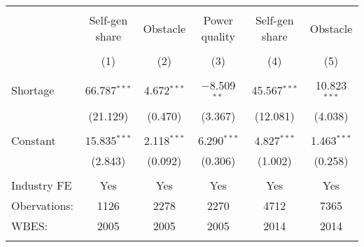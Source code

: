 
\begingroup 
\small 
\begin{tabular}{@{\extracolsep{5pt}}lccccc} 
\\[-1.8ex]\hline 
\hline \\[-1.8ex] 
 & Self-gen share & Obstacle & Power quality & Self-gen share & Obstacle \\ 
\\[-1.8ex] & (1) & (2) & (3) & (4) & (5)\\ 
\hline \\[-1.8ex] 
 Shortage & 66.787$^{***}$ & 4.672$^{***}$ & $-$8.509$^{**}$ & 45.567$^{***}$ & 10.823$^{***}$ \\ 
  & (21.129) & (0.470) & (3.367) & (12.081) & (4.038) \\ 
  & & & & & \\ 
 Constant & 15.835$^{***}$ & 2.118$^{***}$ & 6.290$^{***}$ & 4.827$^{***}$ & 1.463$^{***}$ \\ 
  & (2.843) & (0.092) & (0.306) & (1.002) & (0.258) \\ 
  & & & & & \\ 
Industry FE & Yes & Yes & Yes & Yes & Yes \\ 
Obervations: & 1126 & 2278 & 2270 & 4712 & 7365 \\ 
WBES: & 2005 & 2005 & 2005 & 2014 & 2014 \\ 
\hline \\[-1.8ex] 
\end{tabular} 
\endgroup 
